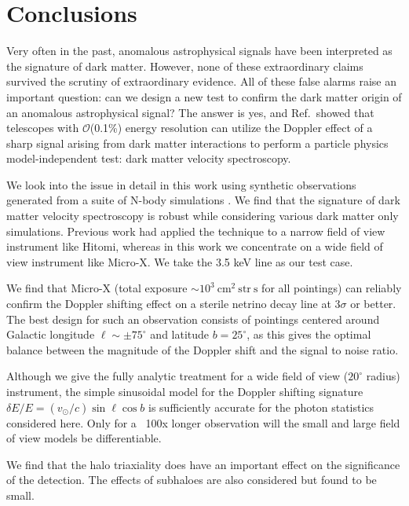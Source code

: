 \documentclass[aps,prd,10pt,twocolumn,superscriptaddress,showpacs]{revtex4-1}
\newcommand{\units}[1]{~\mathrm{#1}}
\begin{document}
\section{Conclusions}
\label{sec:conclusions}

Very often in the past, anomalous astrophysical signals have been interpreted as the signature of dark matter.  However, none of these extraordinary claims survived the scrutiny of extraordinary evidence.  All of these false alarms raise an important question:  can we design a new test to confirm the dark matter origin of an anomalous astrophysical signal?  The answer is yes, and Ref.\,\cite{speckhard2016} showed that telescopes with $\mathcal{O}$(0.1\%) energy resolution can utilize the Doppler effect of a sharp signal arising from dark matter interactions to perform a particle physics model-independent test: dark matter velocity spectroscopy.

We look into the issue in detail in this work using synthetic observations generated from a suite
of N-body simulations \cite{mao2015}.  We find that the signature of dark matter velocity spectroscopy is robust while considering various dark matter only simulations.  Previous work had applied the technique to a narrow field of view instrument like Hitomi, whereas in this work we concentrate on a wide field of view instrument like Micro-X.  We take the 3.5 keV line as our test case. 

We find that Micro-X (total
exposure $\sim10^3\units{cm^2~str~s}$ for all pointings) can reliably confirm the Doppler
shifting effect on a sterile netrino decay line at $3\sigma$ or better. The best design for such an
observation consists of pointings centered around Galactic longitude $\ell\sim\pm75^\circ$ and
latitude $b=25^\circ$, as this gives the optimal balance between the magnitude of the Doppler shift
and the signal to noise ratio.

Although we give the fully analytic treatment for a wide field of
view ($20^\circ$ radius) instrument, the simple sinusoidal model for the Doppler shifting signature $\delta E/E
= (v_\odot/c) \sin \ell \cos b$ is sufficiently accurate for the photon statistics
considered here. Only for a ~100x longer observation will the small and large field of view models
be differentiable.

We find that the halo
triaxiality does have an important effect on the significance of the detection.  The effects of subhaloes are
also considered but found to be small.
\end{document}
